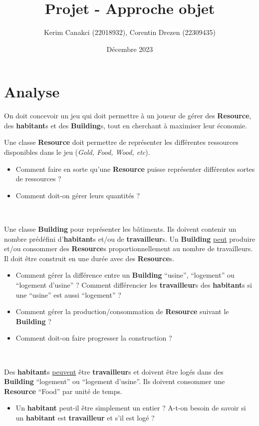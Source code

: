\documentclass{article}
\title{Projet - Approche objet}
\author{Kerim Canakci (22018932), Corentin Drezen (22309435)}
\date{Décembre 2023}
\begin{document}
\maketitle

\section*{Analyse}

On doit concevoir un jeu qui doit permettre à un joueur de gérer des \textbf{Resource}, des \textbf{habitant}s et des \textbf{Building}s, tout en cherchant à maximiser leur économie.
\\
\par Une classe \textbf{Resource} doit permettre de représenter les différentes ressources disponibles dans le jeu (\textit{Gold, Food, Wood, etc}).
\begin{itemize}
    \item Comment faire en sorte qu’une \textbf{Resource} puisse représenter différentes sortes de ressources ?
    \item Comment doit-on gérer leurs quantités ?
\end{itemize}
\ \
\par Une classe \textbf{Building} pour représenter les bâtiments. Ils doivent contenir un nombre prédéfini d’\textbf{habitant}s et/ou de \textbf{travailleur}s. Un \textbf{Building} \underline{peut} produire et/ou consommer des \textbf{Resource}s proportionnellement au nombre de travailleurs. Il doit être construit en une durée avec des \textbf{Resource}s.
\begin{itemize}
    \item Comment gérer la différence entre un \textbf{Building} “usine”, “logement” ou “logement d’usine” ? Comment différencier les \textbf{travailleur}s des \textbf{habitant}s si une “usine” est aussi “logement” ? 
    \item Comment gérer la production/consommation de \textbf{Resource} suivant le \textbf{Building} ? 
    \item Comment doit-on faire progresser la construction ?
\end{itemize}
\ \
\par Des \textbf{habitant}s \underline{peuvent} être \textbf{travailleur}s et doivent être logés dans des \textbf{Building} “logement” ou “logement d’usine”. Ils doivent consommer une \textbf{Resource} “Food” par unité de temps. 
\begin{itemize}
    \item Un \textbf{habitant} peut-il être simplement un entier ? A-t-on besoin de savoir si un \textbf{habitant} est \textbf{travailleur} et s'il est logé ?
\end{itemize}
\end{document}
